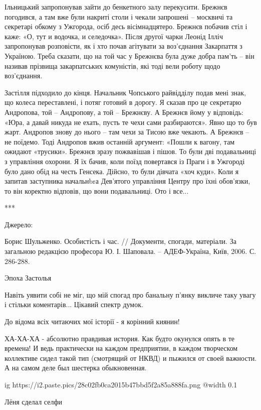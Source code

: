 \begin{itemize}
Ільницький запропонував зайти до бенкетного залу перекусити. Брежнєв погодився,
а там вже були накриті столи і чекали запрошені – москвичі та секретарі обкому
з Ужгорода, осіб десь вісімнадцятеро. Брежнєв побачив стіл і каже: «О, тут и
водочка, и селедочка». Після другої чарки Леонід Ілліч запропонував розповісти,
як і хто почав агітувати за воз’єднання Закарпаття з Україною. Треба сказати,
що на той час у Брежнєва була дуже добра пам’ть – він називав прізвища
закарпатських комуністів, які тоді вели роботу щодо воз’єднання.

Застілля підходило до кінця. Начальник Чопського райвідділу подав мені знак, що
колеса переставлені, і потяг готовий в дорогу. Я сказав про це секретарю
Андропова, той – Андропову, а той – Брежнєву. А Брежнєв йому у відповідь: «Юра,
а давай никуда не ехать, пусть те чехи сами разбираются». Явно що то був жарт.
Андропов знову до нього – там чехи за Тисою вже чекають. А Брежнєв – не
поїдемо. Тоді Андропов вжив останній аргумент: «Пошли к вагону, там ожидают
«трусики». Брежнєв зразу пожвавішав і пішов. То були дві подавальниці з
управління охорони. Я їх бачив, коли поїзд повертався із Праги і в Ужгороді
було дано обід на честь Генсека. Дійсно, то були дівчата «хоч куди». Коли я
запитав заступника начальнbrа Дев’ятого управління Центру про їхні обов’язки,
то він коректно відповів, що вони подавальниці. Ото і все...

***

Джерело:

Борис Шульженко. Особистість і час. // Документи, спогади, матеріали. За
загальною редакцією професора Ю. І. Шаповала. – АДЕФ-Україна, Київ, 2006. С.
286-288.


Эпоха Застолья


Навіть уявити собі не міг, що мій спогад про банальну п'янку викличе таку увагу
і стільки коментарів...  Цікавий спектр думок.


До відома всіх читаючих мої історії - я корінний киянин!


ХА-ХА-ХА - абсолютно правдивая история. Как будто окунулся опять в те времена!
И ведь практически на каждом предприятии, в каждом творческом коллективе сидел
такой тип (смотрящий от НКВД) и пыжился от своей важности. А на самом деле был
шестерка обыкновенная.


\ifcmt
  ig https://i2.paste.pics/28c02fb0ca2015b47bbd5f2a85a888fa.png
  @width 0.1
\fi

Лёня сделал селфи


\end{itemize} %
